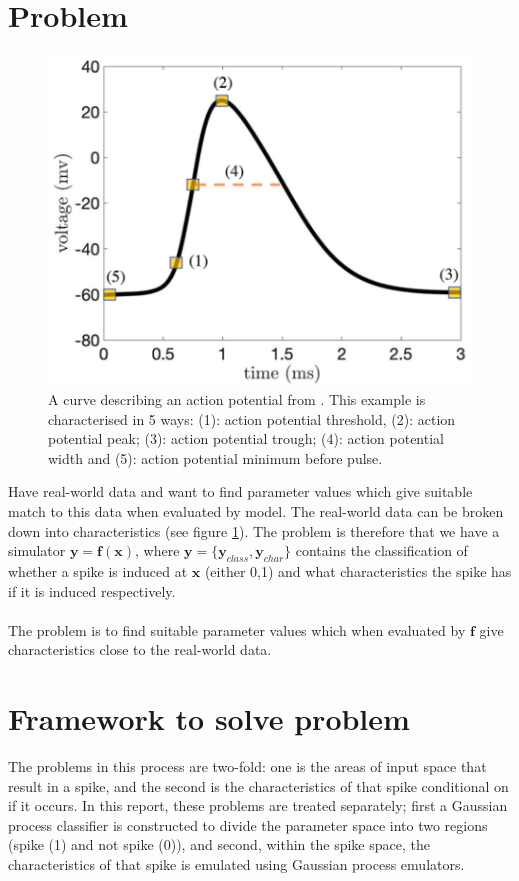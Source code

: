 \documentclass{article}
\newcommand{\simulator}{f}
\newcommand{\inputVec}{\mathbf{x}}
\newcommand{\outputVec}{\mathbf{y}}
\begin{document}
\section{Problem}
\begin{figure}[t]
    \centering
    \includegraphics[width=\linewidth]{spike_characteristics.png}
    \caption{A curve describing an action potential from \citet{Saghafi2024}. This example is characterised in 5 ways: (1): action potential threshold, (2): action potential peak; (3): action potential trough; (4): action potential width and (5): action potential minimum before pulse.}
    \label{fig:spike_char}
\end{figure}
Have real-world data and want to find parameter values which give suitable match to this data when evaluated by model. The real-world data can be broken down into characteristics (see figure \ref{fig:spike_char}). The problem is therefore that we have a simulator $\outputVec = \mathbf{\simulator}(\inputVec)$, where $\outputVec = \{\outputVec_{class}, \outputVec_{char}\}$ contains the classification of whether a spike is induced at $\inputVec$ (either 0,1) and what characteristics the spike has if it is induced respectively. \\\\
The problem is to find suitable parameter values which when evaluated by $\mathbf{\simulator}$ give characteristics close to the real-world data.
\section{Framework to solve problem}
The problems in this process are two-fold: one is the areas of input space that result in a spike, and the second is the characteristics of that spike conditional on if it occurs. In this report, these problems are treated separately; first a Gaussian process classifier is constructed to divide the parameter space into two regions (spike (1) and not spike (0)), and second, within the spike space, the characteristics of that spike is emulated using Gaussian process emulators.
\end{document}
